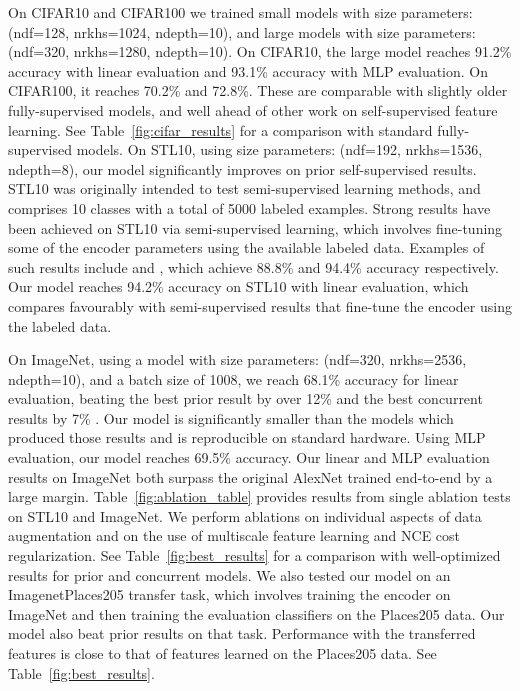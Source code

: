 \documentclass{article}
\begin{document}
On CIFAR10 and CIFAR100 we trained small models with size parameters: (ndf=128, nrkhs=1024, ndepth=10), and large models with size parameters: (ndf=320, nrkhs=1280, ndepth=10). On CIFAR10, the large model reaches 91.2\% accuracy with linear evaluation and 93.1\% accuracy with MLP evaluation. On CIFAR100, it reaches 70.2\% and 72.8\%. These are comparable with slightly older fully-supervised models, and well ahead of other work on self-supervised feature learning. See Table~\ref{fig:cifar_results} for a comparison with standard fully-supervised models.
On STL10, using size parameters: (ndf=192, nrkhs=1536, ndepth=8), our model significantly improves on prior self-supervised results.
STL10 was originally intended to test semi-supervised learning methods, and comprises 10 classes with a total of 5000 labeled examples.
Strong results have been achieved on STL10 via semi-supervised learning, which involves fine-tuning some of the encoder parameters using the available labeled data.
Examples of such results include \citep{Ji2019} and \citep{Berthelot2019}, which achieve 88.8\% and 94.4\% accuracy respectively. Our model reaches 94.2\% accuracy on STL10 with linear evaluation, which compares favourably with semi-supervised results that fine-tune the encoder using the labeled data.

On ImageNet, using a model with size parameters: (ndf=320, nrkhs=2536, ndepth=10), and a batch size of 1008, we reach 68.1\% accuracy for linear evaluation, beating the best prior result by over 12\% and the best concurrent results by 7\% \citep{Kolesnikov2019, Henaff2019, Tian2019}. Our model is significantly smaller than the models which produced those results and is reproducible on standard hardware.
Using MLP evaluation, our model reaches 69.5\% accuracy. Our linear and MLP evaluation results on ImageNet both surpass the original AlexNet trained end-to-end by a large margin.
Table~\ref{fig:ablation_table} provides results from single ablation tests on STL10 and ImageNet.
We perform ablations on individual aspects of data augmentation and on the use of multiscale feature learning and NCE cost regularization.
See Table~\ref{fig:best_results} for a comparison with well-optimized results for prior and concurrent models.
We also tested our model on an ImagenetPlaces205 transfer task, which involves training the encoder on ImageNet and then training the evaluation classifiers on the Places205 data.
Our model also beat prior results on that task. Performance with the transferred features is close to that of features learned on the Places205 data. See Table~\ref{fig:best_results}.
\end{document}
